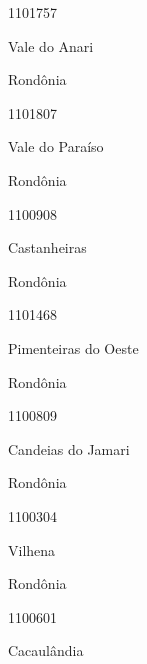 \documentclass[
  letterpaper,
]{report}
\begin{document}
\n      

1101757

\n      

Vale do Anari

\n    

\n    

\n      

Rondônia

\n      

1101807

\n      

Vale do Paraíso

\n    

\n    

\n      

Rondônia

\n      

1100908

\n      

Castanheiras

\n    

\n    

\n      

Rondônia

\n      

1101468

\n      

Pimenteiras do Oeste

\n    

\n    

\n      

Rondônia

\n      

1100809

\n      

Candeias do Jamari

\n    

\n    

\n      

Rondônia

\n      

1100304

\n      

Vilhena

\n    

\n    

\n      

Rondônia

\n      

1100601

\n      

Cacaulândia
\end{document}
